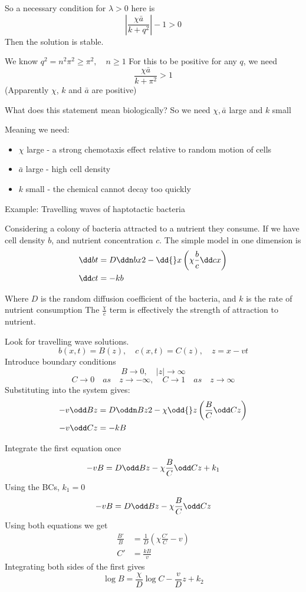 \documentclass{X:/Documents/Coding/Latex/myassignment}
\begin{document}
So a necessary condition for $\lambda > 0$ here is
\[\left|\frac{\chi \bar{a}}{k + q^2}\right| -1 >0\]
Then the solution is stable.

We know $q^2 = n^2\pi^2 \geq \pi^2, \quad n \geq 1$
For this to be positive for any $q$, we need
\[\frac{\chi \bar{a}}{k + \pi^2} >1\]
(Apparently $\chi$, $k$ and $\bar{a}$ are positive)

What does this statement mean biologically?
So we need $\chi, \bar{a}$ large and $k$ small

Meaning we need:
\begin{itemize}
 	\item  $\chi$ large - a strong chemotaxis effect relative to random motion of cells 
	\item  $\bar{a}$ large - high cell density
	\item $k$ small - the chemical cannot decay too quickly
 \end{itemize}



Example: Travelling waves of haptotactic bacteria

Considering a colony of bacteria attracted to a nutrient they consume. If we have cell density $b$, and nutrient concentration $c$. The simple model in one dimension is
\begin{align*}
	\dd bt &= D \ddn bx2 - \dd{}x \left(\chi \frac{b}{c} \dd cx\right)\\
	\dd ct &= - kb
\end{align*}

Where $D$ is the random diffusion coefficient of the bacteria, and $k$ is the rate of nutrient consumption
The $\frac{\chi}{c}$ term is effectively the strength of attraction to nutrient.


Look for travelling wave solutions.
\[b(x,t) = B(z), \quad c(x,t) = C(z), \quad z = x - v t\]
Introduce boundary conditions
\[B\to 0, \quad |z| \to \infty\]
\[C\to 0 \quad as \quad z \to - \infty, \quad C\to 1 \quad as \quad z\to \infty\]
Substituting into the system gives:
\begin{align*}
	-v \odd Bz &= D \oddn Bz2 - \chi \odd{}z \left(\frac{B}{C} \odd Cz\right)\\
	-v \odd Cz &= - kB
\end{align*}

Integrate the first equation once
\begin{align*}
	-v B &= D \odd Bz - \chi \frac{B}{C} \odd Cz + k_1\\
\end{align*}
Using the BCs, $k_1 =0$
\[-v B = D \odd Bz - \chi \frac{B}{C} \odd Cz\]
Using both equations we get
\begin{align*}
 	\frac{B'}{B} &= \frac{1}{D} \left(\chi \frac{C'}{C} - v\right)\\
 	C' &= \frac{kB}{v}
 \end{align*} 
Integrating both sides of the first gives
\[ \log B = \frac{\chi}{D} \log C - \frac{v}{D} z + k_2 \]
\end{document}
